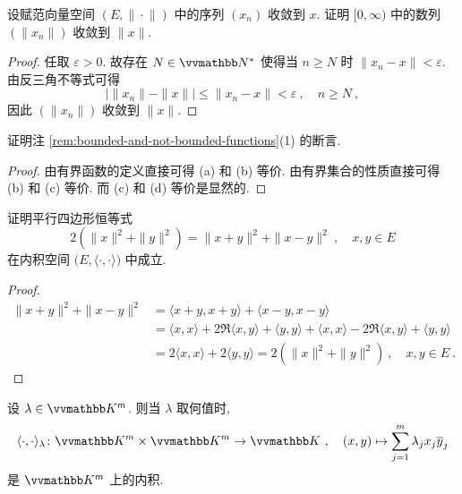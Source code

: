 \begin{exercise}
    设赋范向量空间 \((E, \|\!\cdot\!\|)\) 中的序列 \((x_n)\) 收敛到 \(x\). 证明 \([0,\infty)\) 中的数列 \((\|x_n\|)\) 收敛到 \(\|x\|\).
\end{exercise}

\begin{proof}
    任取 \(\varepsilon > 0\). 故存在 \(N \in \N^\ast\) 使得当 \(n \geq N\) 时 \(\|x_n - x\| < \varepsilon\). 由反三角不等式可得
    \[
        \bigl|\|x_n\| - \|x\|\bigr| \leq \|x_n - x\| < \varepsilon\ ,\quad n \geq N\ ,
    \]
    因此 \((\|x_n\|)\) 收敛到 \(\|x\|\).
\end{proof}

\begin{exercise}
    证明注 \ref{rem:bounded-and-not-bounded-functions}(1) 的断言.
\end{exercise}

\begin{proof}
    由有界函数的定义直接可得 (a) 和 (b) 等价. 由有界集合的性质直接可得 (b) 和 (c) 等价. 而 (c) 和 (d) 等价是显然的.
\end{proof}

\begin{exercise}
    证明平行四边形恒等式
    \[
        2 (\|x\|^2 + \|y\|^2) = \|x + y\|^2 + \|x - y\|^2\ ,\quad x, y \in E
    \]
    在内积空间 \(\bigl(E, \langle \cdot, \cdot \rangle\bigr)\) 中成立.
\end{exercise}

\begin{proof}
    \begin{align*}
        \|x + y\|^2 + \|x - y\|^2 &= \langle x + y, x + y \rangle + \langle x - y, x - y \rangle \\
        &= \langle x, x \rangle + 2 \Re \langle x, y \rangle + \langle y, y \rangle + \langle x, x \rangle - 2 \Re \langle x, y \rangle + \langle y, y \rangle \\
        &= 2 \langle x, x \rangle + 2 \langle y, y \rangle = 2 (\|x\|^2 + \|y\|^2)\ ,\quad x, y \in E\ .
    \end{align*}
\end{proof}

\begin{exercise}
    设 \(\lambda \in \K^m\). 则当 \(\lambda\) 取何值时,
    \[
        \langle \cdot, \cdot \rangle_\lambda \colon \K^m \times \K^m \to \K\ ,\quad (x, y) \mapsto \sum_{j = 1}^m \lambda_j x_j \overline y_j
    \]
    是 \(\K^m\) 上的内积.
\end{exercise}

